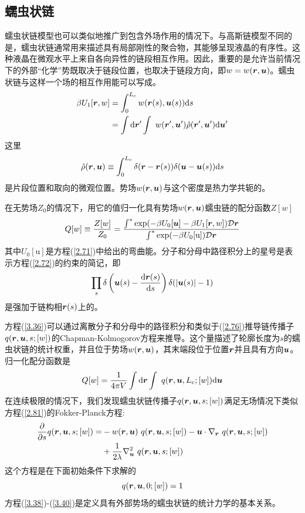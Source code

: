 \subsection{蠕虫状链}
蠕虫状链模型也可以类似地推广到包含外场作用的情况下。与高斯链模型不同的是，蠕虫状链通常用来描述具有局部刚性的聚合物，其能够呈现液晶的有序性。这种液晶在微观水平上来自各向异性的链段相互作用。因此，重要的是允许当前情况下的外部“化学”势既取决于链段位置，也取决于链段方向，即$w=w(\bm{r},\bm{u})$。蠕虫状链与这样一个场的相互作用能可以写成。
\begin{equation}\label{3.34}
\begin{aligned}
\beta U_1[\bm{r},w]&=\int_0^{L_c}w(\bm{r}(s),\bm{u}(s))\mathrm{d}s\\
&=\int\mathrm{d}\bm{r}'\int~w(\bm{r}',\bm{u}')\hat{\rho}(\bm{r}',\bm{u}')\mathrm{d}\bm{u}'
\end{aligned}
\end{equation}
这里
\begin{equation}\label{3.35}
\hat{\rho}(\bm{r},\bm{u})\equiv\int_0^{L_c}\delta(\bm{r}-\bm{r}(s))\delta(\bm{u}-\bm{u}(s))\mathrm{d}s
\end{equation}
是片段位置和取向的微观位置。势场$w(\bm{r},\bm{u})$与这个密度是热力学共轭的。

在无势场$Z_0$的情况下，用它的值归一化具有势场$w(\bm{r},\bm{u})$蠕虫链的配分函数$Z[w]$
\begin{equation}\label{3.36}
Q[w]\equiv\frac{Z[w]}{Z_0}=\frac{\int^*\exp(-\beta U_0[\bm{u}]-\beta U_1[\bm{r},w])\mathcal{D}\bm{r}}{\int^*\exp(-\beta U_0[\mathrm{u}])\mathcal{D}\bm{r}}
\end{equation}
其中$U_0[\mathrm{u}]$是方程(\ref{2.71})中给出的弯曲能。分子和分母中路径积分上的星号是表示方程(\ref{2.72})的约束的简记，即
\begin{equation}\label{3.37}
\prod\limits_s\delta\left(\bm{u}(s)-\frac{\mathrm{d}\bm{r}(s)}{\mathrm{d}s}\right)\delta(\left|\bm{u}(s)\right|-1)
\end{equation}
是强加于链构相$\bm{r}(s)$上的。

方程(\ref{3.36})可以通过离散分子和分母中的路径积分和类似于(\ref{2.76})推导链传播子$q(\bm{r},\bm{u},s;[w])$的Chapman-Kolmogorov方程来推导。这个量描述了轮廓长度为$s$的蠕虫状链的统计权重，并且位于势场$w(\bm{r},\bm{u})$，其末端段位于位置$\bm{r}$并且具有方向$\bm{u}$。归一化配分函数是
\begin{equation}\label{3.38}
Q[w]=\frac{1}{4\pi V}\int\mathrm{d}\bm{r}\int~q(\bm{r},\bm{u},L_c;[w])\mathrm{d}\bm{u}
\end{equation}
在连续极限的情况下，我们发现蠕虫状链传播子$q(\bm{r},\bm{u},s;[w])$满足无场情况下类似方程(\ref{2.81})的Fokker-Planck方程:
\begin{equation}\label{3.39}
\begin{aligned}
\frac{\partial}{\partial s}q(\bm{r},\bm{u},s;[w])=&-w(\bm{r},\bm{u})~q(\bm{r},\bm{u},s;[w])-\bm{u}\cdot\nabla_{\bm{r}}~q(\bm{r},\bm{u},s;[w])\\
&+\frac{1}{2\lambda}\nabla_{\bm{u}}^2~q(\bm{r},\bm{u},s;[w])
\end{aligned}
\end{equation}
这个方程是在下面初始条件下求解的
\begin{equation}\label{3.40}
q(\bm{r},\bm{u},0;[w])=1
\end{equation}
方程(\ref{3.38})-(\ref{3.40})是定义具有外部势场的蠕虫状链的统计力学的基本关系。

